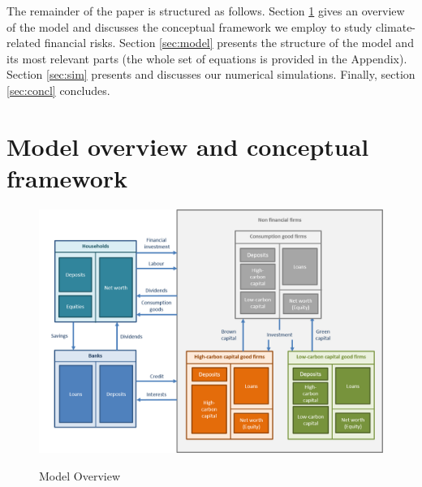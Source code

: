 \documentclass[authoryear]{article}
\begin{document}
The remainder of the paper is structured as follows. Section \ref{sec:concept} gives an overview of the model and discusses the conceptual framework we employ to study climate-related financial risks. Section \ref{sec:model} presents the structure of the model and its most relevant parts (the whole set of equations is provided in the Appendix). Section \ref{sec:sim} presents and discusses our numerical simulations. Finally, section \ref{sec:concl} concludes.


\section{Model overview and conceptual framework}
\label{sec:concept}

\begin{figure}
\centering
\caption{Model Overview}
\includegraphics[width=12cm]{Figures/ModelOverview.png}
\label{fig:Model}
\end{figure}
\end{document}
